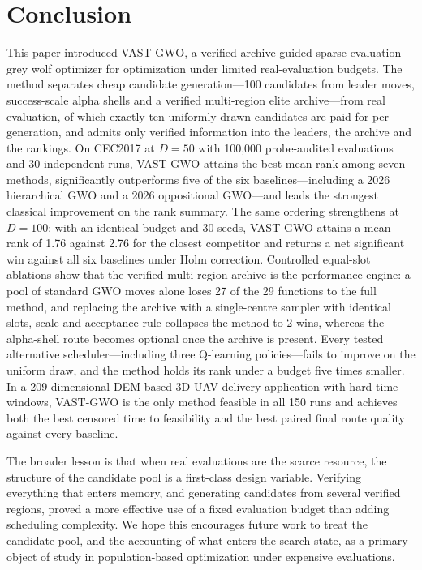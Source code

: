 \documentclass[11pt,a4paper]{article}
\newcommand{\method}{VAST-GWO}
\begin{document}
\section{Conclusion}
\label{sec:conclusion}
This paper introduced \method{}, a verified archive-guided sparse-evaluation
grey wolf optimizer for optimization under limited real-evaluation budgets.
The method separates cheap candidate generation---100 candidates from leader
moves, success-scale alpha shells and a verified multi-region elite
archive---from real evaluation, of which exactly ten uniformly drawn
candidates are paid for per generation, and admits only verified information
into the leaders, the archive and the rankings. On CEC2017 at $D=50$ with
100{,}000 probe-audited evaluations and 30 independent runs, \method{} attains
the best mean rank among seven methods, significantly outperforms five of the
six baselines---including a 2026 hierarchical GWO and a 2026 oppositional
GWO---and leads the strongest classical improvement on the rank summary. The
same ordering strengthens at $D=100$: with an identical budget and 30 seeds,
\method{} attains a mean rank of 1.76 against 2.76 for the closest competitor
and returns a net significant win against all six baselines under Holm
correction. Controlled equal-slot ablations show that the verified multi-region
archive is the performance engine: a pool of standard GWO moves alone loses 27
of the 29 functions to the full method, and replacing the archive with a
single-centre sampler with identical slots, scale and acceptance rule collapses
the method to 2 wins, whereas the alpha-shell route becomes optional once the
archive is present. Every tested alternative scheduler---including three
Q-learning policies---fails to improve on the uniform draw, and the method
holds its rank under a budget five times smaller. In a 209-dimensional
DEM-based 3D UAV delivery application with hard time windows, \method{} is the
only method feasible in all 150 runs and achieves both the best censored time
to feasibility and the best paired final route quality against every baseline.

The broader lesson is that when real evaluations are the scarce resource, the
structure of the candidate pool is a first-class design variable. Verifying
everything that enters memory, and generating candidates from several verified
regions, proved a more effective use of a fixed evaluation budget than adding
scheduling complexity. We hope this encourages future work to treat the
candidate pool, and the accounting of what enters the search state, as a
primary object of study in population-based optimization under expensive
evaluations.
\end{document}
